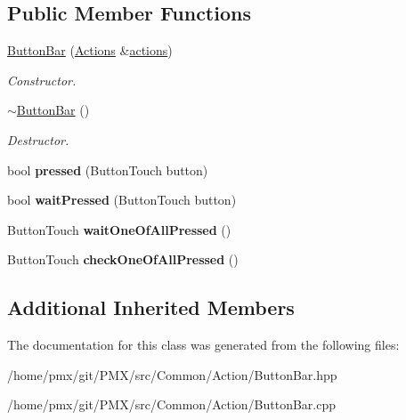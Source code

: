 \subsection*{Public Member Functions}
\begin{DoxyCompactItemize}
\item 
\mbox{\label{classButtonBar_ac31cdb334e7f153595479d4e8c7a44ab}} 
\hyperlink{classButtonBar_ac31cdb334e7f153595479d4e8c7a44ab}{Button\+Bar} (\hyperlink{classActions}{Actions} \&\hyperlink{classAActionsElement_a3fbd5b8201049a59602d8b7201a9ef8a}{actions})
\begin{DoxyCompactList}\small\item\em Constructor. \end{DoxyCompactList}\item 
\mbox{\label{classButtonBar_a44a94367a94dd32baf45379ecbeca948}} 
\hyperlink{classButtonBar_a44a94367a94dd32baf45379ecbeca948}{$\sim$\+Button\+Bar} ()
\begin{DoxyCompactList}\small\item\em Destructor. \end{DoxyCompactList}\item 
\mbox{\label{classButtonBar_a2054f8a32649f17ec6e8929d85a45d76}} 
bool {\bfseries pressed} (Button\+Touch button)
\item 
\mbox{\label{classButtonBar_aa1baddb8099d0bbdf90f19914119cbb4}} 
bool {\bfseries wait\+Pressed} (Button\+Touch button)
\item 
\mbox{\label{classButtonBar_a7595a68c2185e3a904731b9a8eff1b23}} 
Button\+Touch {\bfseries wait\+One\+Of\+All\+Pressed} ()
\item 
\mbox{\label{classButtonBar_ade20f736d6a4b174817d78630cda6bd4}} 
Button\+Touch {\bfseries check\+One\+Of\+All\+Pressed} ()
\end{DoxyCompactItemize}
\subsection*{Additional Inherited Members}


The documentation for this class was generated from the following files\+:\begin{DoxyCompactItemize}
\item 
/home/pmx/git/\+P\+M\+X/src/\+Common/\+Action/Button\+Bar.\+hpp\item 
/home/pmx/git/\+P\+M\+X/src/\+Common/\+Action/Button\+Bar.\+cpp\end{DoxyCompactItemize}

